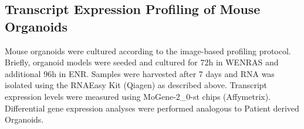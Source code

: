 \begin{flushleft}
\subsection{Transcript Expression Profiling of Mouse Organoids}
Mouse organoids were cultured according to the image-based profiling protocol. Briefly, organoid models were seeded and cultured for 72h in WENRAS and additional 96h in ENR. Samples were harvested after 7 days and RNA was isolated using the RNAEasy Kit (Qiagen) as described above. Transcript expression levels were measured using MoGene-2\_0-st chips (Affymetrix).
Differential gene expression analyses were performed analogous to Patient derived Organoids.

\end{flushleft}